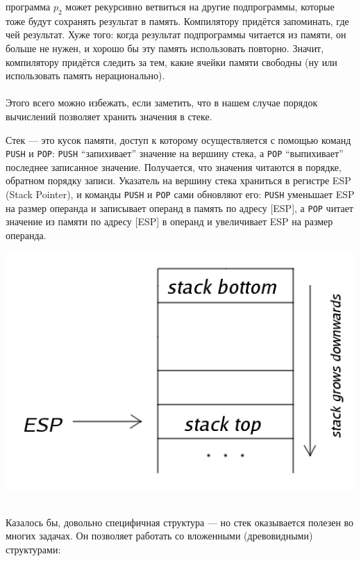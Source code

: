 \documentclass[11pt]{book}
\begin{document}
программа $p_2$ может рекурсивно ветвиться на другие подпрограммы, которые тоже будут сохранять результат в память.
Компилятору придётся запоминать, где чей результат.
Хуже того: когда результат подпрограммы читается из памяти, он больше не нужен, и хорошо бы эту память использовать повторно.
Значит, компилятору придётся следить за тем, какие ячейки памяти свободны (ну или использовать память нерационально).
\\ \\
Этого всего можно избежать, если заметить, что в нашем случае порядок вычислений позволяет хранить значения в стеке.
\\
\bigskip
\begin{minipage}{0.6\textwidth}
Стек --- это кусок памяти, доступ к которому осуществляется с помощью команд \texttt{PUSH} и \texttt{POP}:
\texttt{PUSH} ``запихивает'' значение на вершину стека, а \texttt{POP} ``выпихивает'' последнее записанное значение.
Получается, что значения читаются в порядке, обратном порядку записи.
Указатель на вершину стека храниться в регистре ESP (Stack Pointer), и команды \texttt{PUSH} и \texttt{POP} сами обновляют его:
\texttt{PUSH} уменьшает ESP на размер операнда и записывает операнд в память по адресу [ESP],
а \texttt{POP} читает значение из памяти по адресу [ESP] в операнд и увеличивает ESP на размер операнда.
\end{minipage}
\begin{minipage}{0.4\textwidth}
\centering
\includegraphics[width=\textwidth]{pic/stack.png}
\end{minipage}
\bigskip
\\
Казалось бы, довольно специфичная структура --- но стек оказывается полезен во многих задачах.
Он позволяет работать со вложенными (древовидными) структурами:
\end{document}
